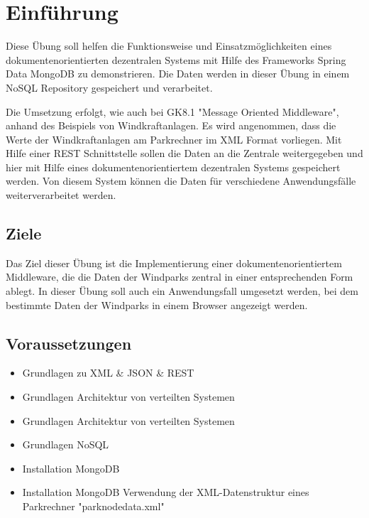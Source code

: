
\section{Einführung}

Diese Übung soll helfen die Funktionsweise und Einsatzmöglichkeiten eines dokumentenorientierten dezentralen Systems mit Hilfe des Frameworks Spring Data MongoDB zu demonstrieren. Die Daten werden in dieser Übung in einem NoSQL Repository gespeichert und verarbeitet.

Die Umsetzung erfolgt, wie auch bei GK8.1 "Message Oriented Middleware", anhand des Beispiels von Windkraftanlagen. Es wird angenommen, dass die Werte der Windkraftanlagen am Parkrechner im XML Format vorliegen. Mit Hilfe einer REST Schnittstelle sollen die Daten an die Zentrale weitergegeben und hier mit Hilfe eines dokumentenorientiertem dezentralen Systems gespeichert werden. Von diesem System können die Daten für verschiedene Anwendungsfälle weiterverarbeitet werden.

\subsection{Ziele}

Das Ziel dieser Übung ist die Implementierung einer dokumentenorientiertem Middleware, die die Daten der Windparks zentral in einer entsprechenden Form ablegt. In dieser Übung soll auch ein Anwendungsfall umgesetzt werden, bei dem bestimmte Daten der Windparks in einem Browser angezeigt werden.

\subsection{Voraussetzungen}

\begin{itemize}
    \item Grundlagen zu XML \& JSON \& REST
    \item Grundlagen Architektur von verteilten Systemen
    \item Grundlagen Architektur von verteilten Systemen
    \item Grundlagen NoSQL
    \item Installation MongoDB
    \item Installation MongoDB
    Verwendung der XML-Datenstruktur eines Parkrechner "parknodedata.xml"
\end{itemize}

